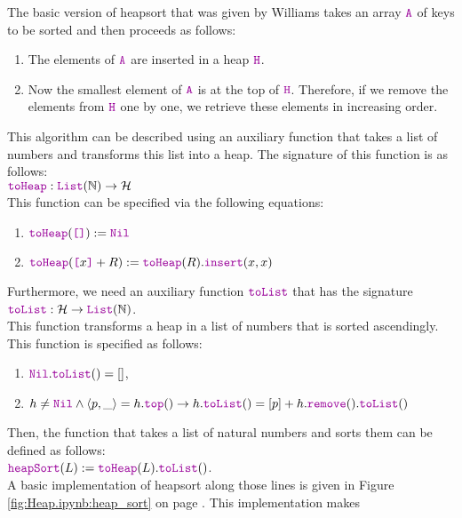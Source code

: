 The basic version of heapsort that was given by Williams takes an array $\mytt{A}$ of keys to be sorted and
then proceeds as follows:
\begin{enumerate}
\item The elements of $\mytt{A}$ are inserted in a heap $\mytt{H}$.
\item Now the smallest element of $\mytt{A}$ is at the top of $\mytt{H}$.  Therefore, if we remove the elements
      from $\mytt{H}$ one by one, we retrieve these elements in increasing order.
\end{enumerate}
This algorithm can be described using an auxiliary function  that takes a list of numbers and
transforms this list into a heap.  The signature of this function is as follows:
\\[0.2cm]
\hspace*{1.3cm}
$\mytt{toHeap}: \mytt{List}(\mathbb{N}) \rightarrow \mathcal{H}$
\\[0.2cm]
This function can be specified via the following equations:
\begin{enumerate}
\item $\mytt{toHeap}(\mytt{[]}) := \mytt{Nil}$
\item $\mytt{toHeap}(\mytt{[}x\mytt{]} + R) := \mytt{toHeap}(R).\mytt{insert}(x, x)$
\end{enumerate}
Furthermore, we need an auxiliary function $\mytt{toList}$ that has the signature
\\[0.2cm]
\hspace*{1.3cm}
$\mytt{toList}: \mathcal{H} \rightarrow \mytt{List}(\mathbb{N})$.
\\[0.2cm]
This function transforms a heap in a list of numbers that is sorted ascendingly.  This function is specified as
follows:
\begin{enumerate}
\item $\mytt{Nil}.\mytt{toList}() = []$,
\item $h \not= \mytt{Nil} \wedge \langle p, \_ \rangle = h.\mytt{top}() \rightarrow h.\mytt{toList}() = [p] + h.\mytt{remove}().\mytt{toList}()$
\end{enumerate}
Then, the function  that takes a list of natural numbers and sorts them can be defined as follows:
\\[0.2cm]
\hspace*{1.3cm}
$\mytt{heapSort}(L) := \mytt{toHeap}(L).\mytt{toList}()$.
\\[0.2cm]
A basic implementation of heapsort along those lines is given in Figure
\ref{fig:Heap.ipynb:heap_sort} on page \pageref{fig:Heap.ipynb:heap_sort}.  This implementation makes 
